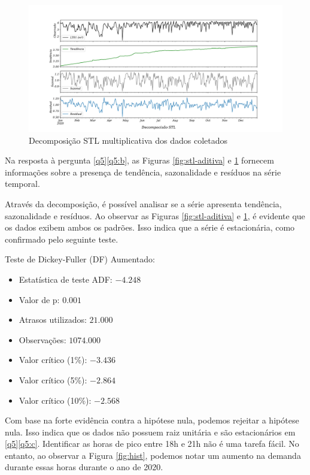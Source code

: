 \begin{figure}[H]
	\centering
	\caption{Decomposição STL multiplicativa dos dados coletados}
	\label{fig:stl}
	\includegraphics[width=0.9\linewidth]{Resultados/Figuras/STL}
	
\end{figure}

Na resposta à pergunta \ref{q5}\ref{q5:b}, as Figuras \ref{fig:stl-aditiva} e \ref{fig:stl} fornecem informações sobre a presença de tendência, sazonalidade e resíduos na série temporal.

Através da decomposição, é possível analisar se a série apresenta tendência, sazonalidade e resíduos. Ao observar as Figuras \ref{fig:stl-aditiva} e \ref{fig:stl}, é evidente que os dados exibem ambos os padrões. Isso indica que a série é estacionária, como confirmado pelo seguinte teste.

Teste de Dickey-Fuller (DF) Aumentado:
\begin{itemize}
	\item Estatística de teste ADF: $-4.248$
	\item Valor de p: $0.001$
	\item Atrasos utilizados: $21.000$
	\item Observações: $1074.000$
	\item Valor crítico (1\%): $-3.436$
	\item Valor crítico (5\%): $-2.864$
	\item Valor crítico (10\%): $-2.568$
\end{itemize}

Com base na forte evidência contra a hipótese nula, podemos rejeitar a hipótese nula. Isso indica que os dados não possuem raiz unitária e são estacionários em \ref{q5}\ref{q5:c}. Identificar as horas de pico entre 18h e 21h não é uma tarefa fácil. No entanto, ao observar a Figura \ref{fig:hist}, podemos notar um aumento na demanda durante essas horas durante o ano de 2020.
	
